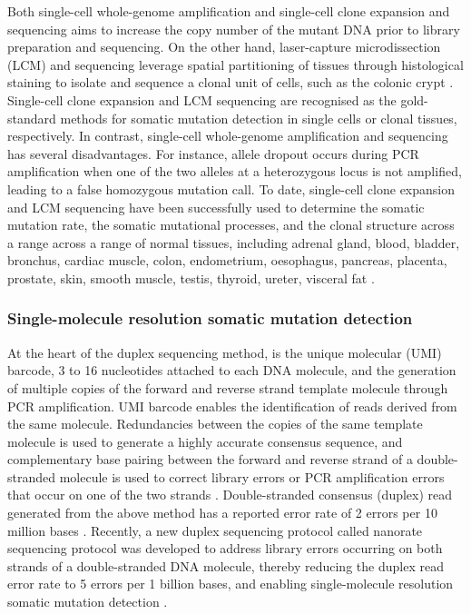 Both single-cell whole-genome amplification \cite{Lodato2018-hh} and single-cell clone expansion and sequencing \cite{Lee-Six2018-qe, MSpencer_Chapman2021-cq} aims to increase the copy number of the mutant DNA prior to library preparation and sequencing. On the other hand, laser-capture microdissection (LCM) and sequencing leverage spatial partitioning of tissues through histological staining to isolate and sequence a clonal unit of cells, such as the colonic crypt \cite{Ellis2021-it}. Single-cell clone expansion and LCM sequencing are recognised as the gold-standard methods for somatic mutation detection in single cells or clonal tissues, respectively. In contrast, single-cell whole-genome amplification and sequencing has several disadvantages. For instance, allele dropout occurs during PCR amplification when one of the two alleles at a heterozygous locus is not amplified, leading to a false homozygous mutation call. To date, single-cell clone expansion and LCM sequencing have been successfully used to determine the somatic mutation rate, the somatic mutational processes, and the clonal structure across a range across a range of normal tissues, including adrenal gland, blood, bladder, bronchus, cardiac muscle, colon, endometrium, oesophagus, pancreas, placenta, prostate, skin, smooth muscle, testis, thyroid, ureter, visceral fat \cite{Lee-Six2018-qe, MSpencer_Chapman2021-cq, Martincorena2015-gu, Ju2017-vw, Martincorena2018-av, Brunner2019-xg, Lee-Six2019-vt, Yoshida2020-yr, Olafsson2020-vi, Moore2020-pi, Lawson2020-em, Coorens2021-ct, Robinson2021-te, Grossmann2021-gd, Moore2021-dl, Park2021-fx, Ng2021-jd, Mitchell2022-ry}. 

\subsubsection{Single-molecule resolution somatic mutation detection}

At the heart of the duplex sequencing method, is the unique molecular (UMI) barcode, 3 to 16 nucleotides attached to each DNA molecule, and the generation of multiple copies of the forward and reverse strand template molecule through PCR amplification. UMI barcode enables the identification of reads derived from the same molecule. Redundancies between the copies of the same template molecule is used to generate a highly accurate consensus sequence, and complementary base pairing between the forward and reverse strand of a double-stranded molecule is used to correct library errors or PCR amplification errors that occur on one of the two strands \cite{Schmitt2012-yr, Hoang2016-jx, Abascal2021-pk}. Double-stranded consensus (duplex) read generated from the above method has a reported error rate of 2 errors per 10 million bases \cite{Abascal2021-pk}. Recently, a new duplex sequencing protocol called nanorate sequencing protocol was developed to address library errors occurring on both strands of a double-stranded DNA molecule, thereby reducing the duplex read error rate to 5 errors per 1 billion bases, and enabling single-molecule resolution somatic mutation detection \cite{Abascal2021-pk}.

